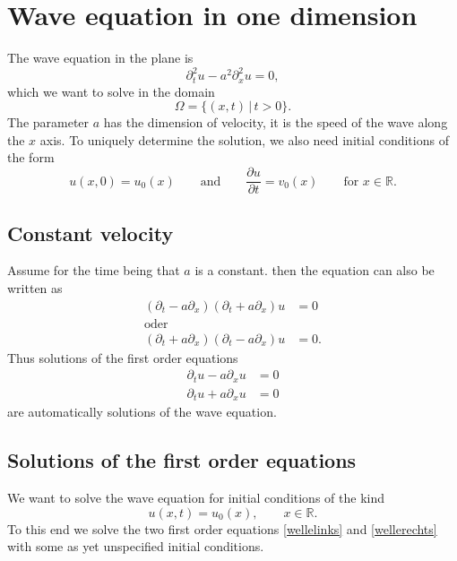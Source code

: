 %
%
%
\section{Wave equation in one dimension}
The wave equation in the plane is
\[
\partial_t^2u-a^2\partial_x^2u=0,
\]
which we want to solve in the domain
\[
\Omega = \{(x,t) \,|\, t > 0\}.
\]
The parameter $a$ has the dimension of velocity, it is the
speed of the wave along the $x$ axis.
To uniquely determine the solution, we also need initial conditions
of the form
\[
u(x,0) = u_0(x)
\qquad\text{and}\qquad
\frac{\partial u}{\partial t} = v_0(x)
\qquad
\text{for $x\in\mathbb R$}.
\]

\subsection{Constant velocity}
Assume for the time being that $a$ is a constant.
then the equation can also be written as
\begin{align*}
(\partial_t -a\partial_x)(\partial_t+a\partial_x)u&=0
\\
\text{oder}&
\\
(\partial_t +a\partial_x)(\partial_t-a\partial_x)u&=0.
\end{align*}
Thus solutions of the first order equations
\begin{align}
\partial_t u-a\partial_x u&=0
\label{wellelinks}
\\
\partial_t u+a\partial_x u&=0
\label{wellerechts}
\end{align}
are automatically solutions of the wave equation.

\subsection{Solutions of the first order equations}
We want to solve the wave equation for initial conditions of the kind
\begin{equation}
u(x,t)=u_0(x),\qquad x\in\mathbb R.
\label{welleanfang}
\end{equation}
To this end we solve the two first order equations
\eqref{wellelinks} and \eqref{wellerechts} with
some as yet unspecified initial conditions.

